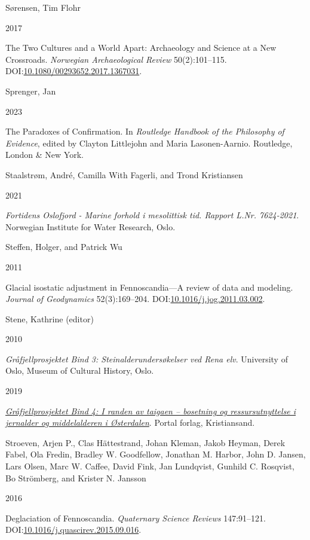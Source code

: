 \documentclass[
  12pt,
  a4paper,
  oneside]{book}
\newlength{\cslhangindent}
\newlength{\csllabelwidth}
\newlength{\cslentryspacingunit} %
\newenvironment{CSLReferences}[2] %
 {%
  \setlength{\parindent}{0pt}
  \ifodd #1
  \let\oldpar\par
  \def\par{\hangindent=\cslhangindent\oldpar}
  \fi
  \setlength{\parskip}{#2\cslentryspacingunit}
 }%
 {}
\newcommand{\CSLBlock}[1]{#1\hfill\break}
\newcommand{\CSLLeftMargin}[1]{\parbox[t]{\csllabelwidth}{#1}}
\newcommand{\CSLRightInline}[1]{\parbox[t]{\linewidth - \csllabelwidth}{#1}\break}
\begin{document}
\begin{CSLReferences}{0}{0}
\leavevmode{}%
\CSLBlock{Sørensen, Tim Flohr}
\CSLLeftMargin{ 2017}
\CSLRightInline{{The Two Cultures and a World Apart: Archaeology and Science at a New Crossroads}. \emph{Norwegian Archaeological Review} 50(2):101--115. DOI:\href{https://doi.org/10.1080/00293652.2017.1367031}{10.1080/00293652.2017.1367031}.}

\leavevmode{}%
\CSLBlock{Sprenger, Jan}
\CSLLeftMargin{ 2023}
\CSLRightInline{{The Paradoxes of Confirmation}. In \emph{{Routledge Handbook of the Philosophy of Evidence}}, edited by Clayton Littlejohn and Maria Lasonen-Aarnio. Routledge, London \& New York.}

\leavevmode{}%
\CSLBlock{Staalstrøm, André, Camilla With Fagerli, and Trond Kristiansen}
\CSLLeftMargin{ 2021}
\CSLRightInline{\emph{{Fortidens Oslofjord - Marine forhold i mesolittisk tid. Rapport L.Nr. 7624-2021}}. Norwegian Institute for Water Research, Oslo.}

\leavevmode{}%
\CSLBlock{Steffen, Holger, and Patrick Wu}
\CSLLeftMargin{ 2011}
\CSLRightInline{{Glacial isostatic adjustment in Fennoscandia---A review of data and modeling}. \emph{Journal of Geodynamics} 52(3):169--204. DOI:\href{https://doi.org/10.1016/j.jog.2011.03.002}{10.1016/j.jog.2011.03.002}.}

\leavevmode{}%
\CSLBlock{Stene, Kathrine (editor)}
\CSLLeftMargin{ 2010}
\CSLRightInline{\emph{{Gråfjellprosjektet Bind 3: Steinalderundersøkelser ved Rena elv}}. University of Oslo, Museum of Cultural History, Oslo.}

\leavevmode{}%
\CSLLeftMargin{ 2019 }
\CSLRightInline{\emph{\href{https://doi.org/10.23865/noasp.54}{{Gråfjellprosjektet Bind 4: I randen av taigaen -- bosetning og ressursutnyttelse i jernalder og middelalderen i Østerdalen}}}. Portal forlag, Kristiansand.}

\leavevmode{}%
\CSLBlock{Stroeven, Arjen P., Clas Hättestrand, Johan Kleman, Jakob Heyman, Derek Fabel, Ola Fredin, Bradley W. Goodfellow, Jonathan M. Harbor, John D. Jansen, Lars Olsen, Marc W. Caffee, David Fink, Jan Lundqvist, Gunhild C. Rosqvist, Bo Strömberg, and Krister N. Jansson}
\CSLLeftMargin{ 2016}
\CSLRightInline{Deglaciation of Fennoscandia. \emph{Quaternary Science Reviews} 147:91--121. DOI:\href{https://doi.org/10.1016/j.quascirev.2015.09.016}{10.1016/j.quascirev.2015.09.016}.}


\end{CSLReferences}
\end{document}
